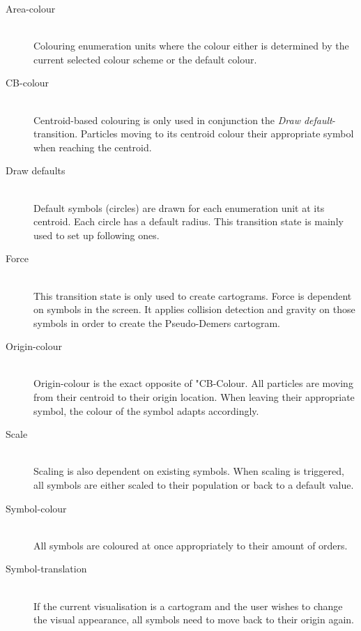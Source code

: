 \begin{description}
\item[Area-colour] \hfill \\
Colouring enumeration units where the colour either is determined by the current selected colour scheme or the default colour.

\item[CB-colour] \hfill \\
Centroid-based colouring is only used in conjunction the \textit{Draw default}-transition. Particles moving to its centroid colour their appropriate symbol when reaching the centroid.

\item[Draw defaults] \hfill \\
Default symbols (circles) are drawn for each enumeration unit at its centroid. Each circle has a default radius. This transition state is mainly used to set up following ones.

\item[Force] \hfill \\
This transition state is only used to create cartograms. Force is dependent on symbols in the screen. It applies collision detection and gravity on those symbols in order to create the Pseudo-Demers cartogram.

\item[Origin-colour] \hfill \\
Origin-colour is the exact opposite of "CB-Colour. All particles are moving from their centroid to their origin location. When leaving their appropriate symbol, the colour of the symbol adapts accordingly.

\item[Scale] \hfill \\
Scaling is also dependent on existing symbols. When scaling is triggered, all symbols are either scaled to their population or back to a default value.

\item[Symbol-colour] \hfill \\
All symbols are coloured at once appropriately to their amount of orders.

\item[Symbol-translation] \hfill \\
If the current visualisation is a cartogram and the user wishes to change the visual appearance, all symbols need to move back to their origin again.

\end{description}


